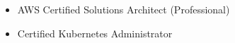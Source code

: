 \documentclass{resume}
\begin{document}



\begin{body}
	\begin{itemize}[noitemsep,topsep=0pt]
		\item AWS Certified Solutions Architect (Professional)
		\item Certified Kubernetes Administrator
	\end{itemize}
\end{body}


\end{document}
